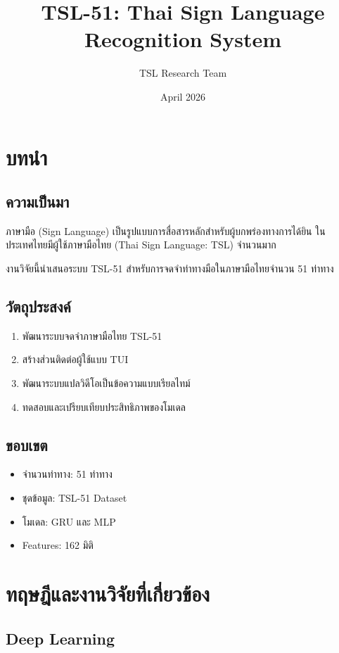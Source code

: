 \documentclass[12pt,a4paper]{report}
\title{TSL-51: Thai Sign Language Recognition System}
\author{TSL Research Team}
\date{April 2026}
\begin{document}
\maketitle

\chapter{บทนำ}

\section{ความเป็นมา}

ภาษามือ (Sign Language) เป็นรูปแบบการสื่อสารหลักสำหรับผู้บกพร่องทางการได้ยิน ในประเทศไทยมีผู้ใช้ภาษามือไทย (Thai Sign Language: TSL) จำนวนมาก

งานวิจัยนี้นำเสนอระบบ TSL-51 สำหรับการจดจำท่าทางมือในภาษามือไทยจำนวน 51 ท่าทาง

\section{วัตถุประสงค์}

\begin{enumerate}
    \item พัฒนาระบบจดจำภาษามือไทย TSL-51
    \item สร้างส่วนติดต่อผู้ใช้แบบ TUI
    \item พัฒนาระบบแปลวิดีโอเป็นข้อความแบบเรียลไทม์
    \item ทดสอบและเปรียบเทียบประสิทธิภาพของโมเดล
\end{enumerate}

\section{ขอบเขต}

\begin{itemize}
    \item จำนวนท่าทาง: 51 ท่าทาง
    \item ชุดข้อมูล: TSL-51 Dataset
    \item โมเดล: GRU และ MLP
    \item Features: 162 มิติ
\end{itemize}

\chapter{ทฤษฎีและงานวิจัยที่เกี่ยวข้อง}

\section{Deep Learning}
\end{document}
